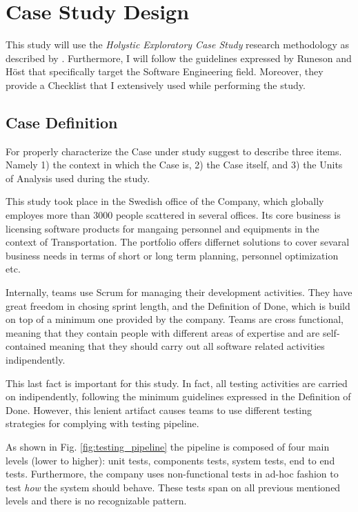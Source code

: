 \chapter{Case Study Design} \label{methods}
This study will use the \textit{Holystic Exploratory Case Study} research methodology as described by \cite{case_study_guide}. Furthermore, I will follow the guidelines expressed by Runeson and H{\"o}st \cite{case_study_software_engineering} that specifically target the Software Engineering field. Moreover, they provide a Checklist that I extensively used while performing the study.



%
%
%
%
\section{Case Definition}	\label{case-description}
For properly characterize the Case under study \cite{case_study_guide} suggest to describe three items. Namely 1) the context in which the Case is, 2) the Case itself, and 3) the Units of Analysis used during the study.

This study took place in the Swedish office of the Company, which globally employes more than 3000 people scattered in several offices. Its core business is licensing software products for mangaing personnel and equipments in the context of Transportation. The portfolio offers differnet solutions to cover sevaral business needs in terms of short or long term planning, personnel optimization etc.

Internally, teams use Scrum for managing their development activities. They have great freedom in chosing sprint length, and the Definition of Done, which is build on top of a minimum one provided by the company. Teams are cross functional, meaning that they contain people with different areas of expertise and are self-contained meaning that they should carry out all software related activities indipendently.

This last fact is important for this study. In fact, all testing activities are carried on indipendently, following the minimum guidelines expressed in the Definition of Done. However, this lenient artifact causes teams to use different testing strategies for complying with testing pipeline. 

As shown in Fig. \ref{fig:testing_pipeline} the pipeline is composed of four main levels (lower to higher): unit tests, components tests, system tests, end to end tests. Furthermore, the company uses non-functional tests in ad-hoc fashion to test \textit{how} the system should behave. These tests span on all previous mentioned levels and there is no recognizable pattern.

